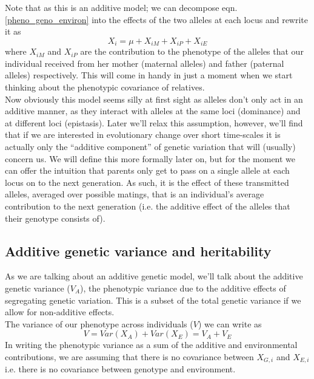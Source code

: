 Note that as this is an additive model; we can decompose eqn. \ref{pheno_geno_environ} into the
effects of the two alleles at each locus and rewrite
it as
\begin{equation}
X_i = \mu + X_{iM}+X_{iP} +X_{iE}
\end{equation}
where $X_{iM}$ and $X_{iP}$ are the contribution to the phenotype of
the alleles that our individual received from her mother (maternal
alleles) and father (paternal alleles) respectively. This will come in
handy in just a moment when we start thinking about the phenotypic covariance of relatives.\\

Now obviously this model seems silly at first sight as alleles don't only act in an additive manner, as they interact with alleles at the same loci (dominance) and at different loci (epistasis). Later we'll relax this assumption, 
however, we'll find that if we are interested in evolutionary change over short time-scales it is actually only the ``additive
component'' of genetic variation that will (usually) concern us. 
We will define this more formally later on, but for the moment 
we can offer the intuition that parents only get to pass on a single allele at each locus on to the next generation. As such, it is the effect of these transmitted alleles, averaged over possible matings, that is an individual's average contribution  to the next generation (i.e. the additive effect of the alleles that their genotype consists of).



\subsection{Additive genetic variance and heritability}
As we are talking about an additive genetic model, we'll talk about the additive genetic variance ($V_A$), the phenotypic variance due to the additive effects of segregating genetic variation. This is a subset of the total genetic
variance if we allow for non-additive effects. \\

The variance of our phenotype across individuals ($V$) we can write as
\begin{equation}
V = Var(X_A) + Var(X_E) = V_A+V_E
\end{equation}
In writing the phenotypic variance as a sum of the additive and environmental contributions, we are assuming that there is no covariance between $X_{G,i}$ and $X_{E,i}$ i.e. there is no covariance between genotype and environment. \\

